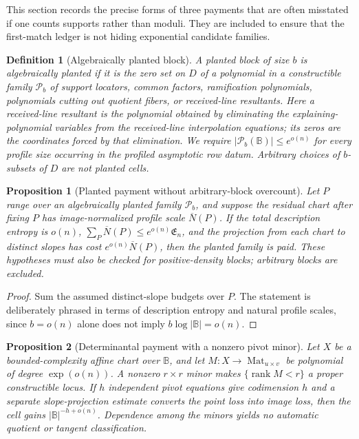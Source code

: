 \documentclass[12pt,a4paper]{amsart}
\numberwithin{equation}{section}
\newtheorem{proposition}[proposition]{Proposition}
\newtheorem{definition}[definition]{Definition}
\theoremstyle{remark}
\DeclareMathOperator{\rank}{rank}
\newcommand{\B}{\mathbb B}
\newcommand{\Pcal}{\mathcal P}
\newcommand{\barN}{\overline N}
\newcommand{\abs}[1]{\lvert #1\rvert}
\begin{document}
This section records the precise forms of three payments that are often misstated if one counts supports rather than moduli.  They are included to ensure that the first-match ledger is not hiding exponential candidate families.

\begin{definition}[Algebraically planted block]\label{def:algebraically-planted}
A planted block of size \(b\) is algebraically planted if it is the zero
set on \(D\) of a polynomial in a constructible family \(\Pcal_b\) of
support locators, common factors, ramification polynomials, polynomials
cutting out quotient fibers, or received-line resultants.  Here a
\emph{received-line resultant} is the polynomial obtained by eliminating
the explaining-polynomial variables from the received-line interpolation
equations; its zeros are the coordinates forced by that elimination.  We
require \(\abs{\Pcal_b(\B)}\le e^{o(n)}\) for every profile size occurring
in the profiled asymptotic row datum.  Arbitrary choices of \(b\)-subsets
of \(D\) are not planted cells.
\end{definition}

\begin{proposition}[Planted payment without arbitrary-block overcount]\label{prop:planted-payment-repaired}
Let \(P\) range over an algebraically planted family \(\Pcal_b\), and
suppose the residual chart after fixing \(P\) has image-normalized profile scale
\(\barN(P)\).  If the total description entropy is \(o(n)\),
\(\sum_P\barN(P)\le e^{o(n)}\mathfrak E_n\), and the projection from each
chart to distinct slopes has cost \(e^{o(n)}\barN(P)\), then the planted
family is paid.  These hypotheses must also be checked for positive-density
blocks; arbitrary blocks are excluded.
\end{proposition}

\begin{proof}
Sum the assumed distinct-slope budgets over \(P\).  The statement is
deliberately phrased in terms of description entropy and natural profile
scales, since \(b=o(n)\) alone does not imply
\(b\log\abs\B=o(n)\).
\end{proof}

\begin{proposition}[Determinantal payment with a nonzero pivot minor]\label{prop:determinantal-payment-repaired}
Let \(X\) be a bounded-complexity affine chart over \(\B\), and let
\(M:X\to\operatorname{Mat}_{u\times v}\) be polynomial of degree
\(\exp(o(n))\).  A nonzero \(r\times r\) minor makes
\(\{\rank M<r\}\) a proper constructible locus.  If \(h\) independent
pivot equations give codimension \(h\) and a separate slope-projection
estimate converts the point loss into image loss, then the cell gains
\(\abs\B^{-h+o(n)}\).  Dependence among the minors yields no automatic
quotient or tangent classification.
\end{proposition}
\end{document}

